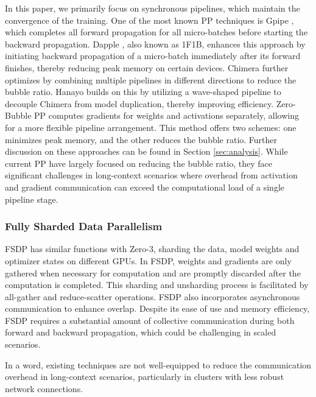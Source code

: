 \documentclass[sigplan,review]{acmart}
\begin{document}
In this paper, we primarily focus on synchronous pipelines, which maintain the convergence of the training. One of the most known PP techniques is Gpipe \cite{gpipe}, which completes all forward propagation for all micro-batches before starting the backward propagation. Dapple \cite{dapple}, also known as 1F1B, enhances this approach by initiating backward propagation of a micro-batch immediately after its forward finishes, thereby reducing peak memory on certain devices. Chimera \cite{li2021chimera} further optimizes by combining multiple pipelines in different directions to reduce the bubble ratio. Hanayo \cite{hanayo} builds on this by utilizing a wave-shaped pipeline to decouple Chimera from model duplication, thereby improving efficiency. Zero-Bubble PP \cite{qi2023zerobubblepipelineparallelism} computes gradients for weights and activations separately, allowing for a more flexible pipeline arrangement. This method offers two schemes: one minimizes peak memory, and the other reduces the bubble ratio. Further discussion on these approaches can be found in Section \ref{sec:analysis}. While current PP have largely focused on reducing the bubble ratio, they face significant challenges in long-context scenarios where overhead from activation and gradient communication can exceed the computational load of a single pipeline stage.


\subsubsection{Fully Sharded Data Parallelism}

FSDP \cite{zhao2023pytorchfsdpexperiencesscaling} has similar functions with Zero-3\cite{rajbhandari2020zeromemoryoptimizationstraining}, sharding the data, model weights and optimizer states on different GPUs. In FSDP, weights and gradients are only gathered when necessary for computation and are promptly discarded after the computation is completed. This sharding and unsharding process is facilitated by all-gather and reduce-scatter operations. FSDP also incorporates asynchronous communication to enhance overlap. Despite its ease of use and memory efficiency, FSDP requires a substantial amount of collective communication during both forward and backward propagation, which could be challenging in scaled scenarios.

In a word, existing techniques are not well-equipped to reduce the communication overhead in long-context scenarios, particularly in clusters with less robust network connections.
\end{document}
